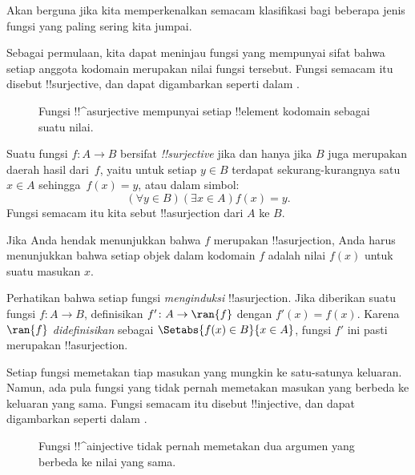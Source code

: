 \documentclass[../../../include/open-logic-section]{subfiles}
\begin{document}

\begin{explain}
Akan berguna jika kita memperkenalkan semacam klasifikasi bagi beberapa jenis
fungsi yang paling sering kita jumpai.

Sebagai permulaan, kita dapat meninjau fungsi yang mempunyai sifat bahwa
setiap anggota kodomain merupakan nilai fungsi tersebut. Fungsi semacam itu
disebut !!{surjective}, dan dapat digambarkan seperti dalam
.

\begin{figure}
  \caption{Fungsi !!^a{surjective} mempunyai setiap !!{element} kodomain
    sebagai suatu nilai.}
\end{figure}
\end{explain}

\begin{defn}
Suatu fungsi $f \colon A \rightarrow B$ bersifat \emph{!!{surjective}} jika
dan hanya jika $B$ juga merupakan daerah hasil dari~$f$, yaitu untuk setiap
$y \in B$ terdapat sekurang-kurangnya satu $x \in A$ sehingga~$f(x) = y$,
atau dalam simbol:
\[
  (\forall y \in B)(\exists x \in A)f(x) = y.
\]
Fungsi semacam itu kita sebut !!a{surjection} dari $A$ ke $B$.
\end{defn}

\begin{explain}
Jika Anda hendak menunjukkan bahwa $f$ merupakan !!a{surjection}, Anda harus
menunjukkan bahwa setiap objek dalam kodomain $f$ adalah nilai $f(x)$ untuk
suatu masukan $x$.

Perhatikan bahwa setiap fungsi \emph{menginduksi} !!a{surjection}. Jika
diberikan suatu fungsi $f \colon A \to B$, definisikan $f' \colon A \to
\ran{f}$ dengan $f'(x) = f(x)$. Karena $\ran{f}$ \emph{didefinisikan} sebagai
$\Setabs{f(x) \in B}{x \in A}$, fungsi $f'$ ini pasti merupakan
!!a{surjection}.
\end{explain}

\begin{explain}
Setiap fungsi memetakan tiap masukan yang mungkin ke satu-satunya keluaran.
Namun, ada pula fungsi yang tidak pernah memetakan masukan yang berbeda ke
keluaran yang sama. Fungsi semacam itu disebut !!{injective}, dan dapat
digambarkan seperti dalam .
\begin{figure}
  \caption{Fungsi !!^a{injective} tidak pernah memetakan dua argumen yang
    berbeda ke nilai yang sama.}
\end{figure}
\end{explain}
\end{document}

